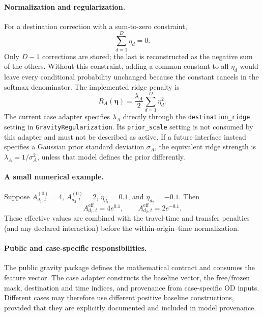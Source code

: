 \paragraph{Normalization and regularization.}
For a destination correction with a sum-to-zero constraint,
\begin{equation}
    \sum_{d=1}^{D}\eta_d=0.
\end{equation}
Only $D-1$ corrections are stored; the last is reconstructed as the negative
sum of the others.  Without this constraint, adding a common constant to all
$\eta_d$ would leave every conditional probability unchanged because the
constant cancels in the softmax denominator.  The implemented ridge penalty is
\begin{equation}
    R_A(\boldsymbol\eta)
      = \frac{\lambda_A}{2}\sum_{d=1}^{D}\eta_d^2.
\end{equation}
The current case adapter specifies $\lambda_A$ directly through the
\texttt{destination\_ridge} setting in \texttt{GravityRegularization}.  Its
\texttt{prior\_scale} setting is not consumed by this adapter and must not be
described as active.  If a future interface instead specifies a Gaussian prior
standard deviation $\sigma_A$, the equivalent ridge strength is
$\lambda_A=1/\sigma_A^2$, unless that model defines the prior differently.

\paragraph{A small numerical example.}
Suppose $A^{(0)}_{d_1,t}=4$, $A^{(0)}_{d_2,t}=2$,
$\eta_{d_1}=0.1$, and $\eta_{d_2}=-0.1$.  Then
\begin{equation}
    A^{\mathrm{eff}}_{d_1,t}=4e^{0.1},
    \qquad
    A^{\mathrm{eff}}_{d_2,t}=2e^{-0.1}.
\end{equation}
These effective values are combined with the travel-time and transfer
penalties (and any declared interaction) before the within-origin--time
normalization.

\paragraph{Public and case-specific responsibilities.}
The public gravity package defines the mathematical contract and consumes the
feature vector.  The case adapter constructs the baseline vector, the
free/frozen mask, destination and time indices, and provenance from
case-specific OD inputs.  Different cases may therefore use different
positive baseline constructions, provided that they are explicitly documented
and included in model provenance.

